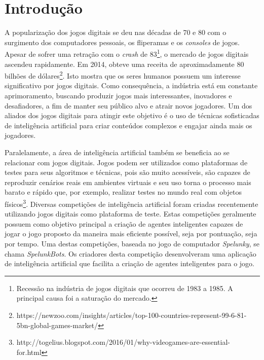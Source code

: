 \chapter{\label{chap:introduction}Introdução}


A popularização dos jogos digitais se deu nas décadas de 70 e 80 com o
surgimento dos computadores pessoais, os fliperamas e os \textit{consoles} de
jogos. Apesar de sofrer uma retração com o \textit{crash} de
83\footnote{Recessão na indústria de jogos digitais que ocorreu de 1983 a 1985.
A principal causa foi a saturação do mercado.}, o mercado de jogos digitais
ascendeu rapidamente. Em 2014, obteve uma receita de aproximadamente 80 bilhões
de
dólares\footnote{https://newzoo.com/insights/articles/top-100-countries-represent-99-6-81-5bn-global-games-market/}.
Isto mostra que os seres humanos possuem um interesse significativo por jogos
digitais. Como consequência, a indústria está em constante aprimoramento,
buscando produzir jogos mais interessantes, inovadores e desafiadores, a fim de
manter seu público alvo e atrair novos jogadores. Um dos aliados dos jogos
digitais para atingir este objetivo é o uso de técnicas sofisticadas de
inteligência artificial para criar conteúdos complexos e engajar ainda mais
os jogadores\cite{PanoramaAIGames}.

Paralelamente, a área de inteligência artificial também se beneficia ao se
relacionar com jogos digitais. Jogos podem ser utilizados como plataformas de
testes para seus algoritmos e técnicas, pois são muito acessíveis, são capazes
de reproduzir cenários reais em ambientes virtuais e seu uso torna o processo
mais barato e rápido que, por exemplo, realizar testes no mundo real com objetos
físicos\footnote{http://togelius.blogspot.com/2016/01/why-videogames-are-essential-for.html}.
Diversas competições de inteligência artificial foram criadas recentemente
utilizando jogos digitais como plataforma de teste\cite{GameAiCompetition}.
Estas competições geralmente possuem como objetivo principal a criação de
agentes inteligentes capazes de jogar o jogo proposto da maneira mais eficiente
possível, seja por pontuação, seja por tempo. Uma destas competições, baseada no
jogo de computador \textit{Spelunky}, se chama \textit{SpelunkBots}. Os
criadores desta competição desenvolveram uma aplicação de inteligência
artificial que facilita a criação de agentes inteligentes para o jogo.

